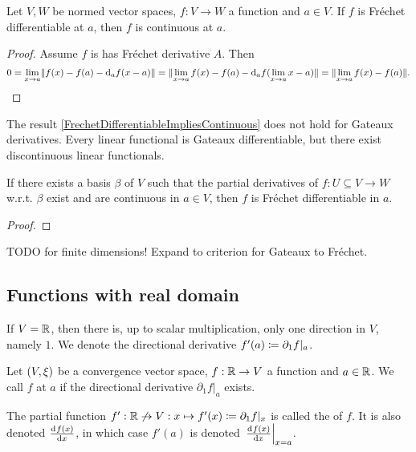 \begin{proposition} \label{FrechetDifferentiableImpliesContinuous}
Let $V,W$ be normed vector spaces, $f:V\to W$ a function and $a\in V$. If $f$ is Fréchet differentiable at $a$, then $f$ is continuous at $a$.
\end{proposition}
\begin{proof}
Assume $f$ is has Fréchet derivative $A$. Then
\[ 0 = \lim_{x\to a} \lVert f(x) - f(a) - \operatorname{d \!}{_af}(x-a)\rVert = \lVert\lim_{x\to a}f(x) - f(a) - \operatorname{d \!}{_af}(\lim_{x\to a} x-a)\rVert = \lVert\lim_{x\to a}f(x) - f(a)\rVert. \]
\end{proof}

\begin{example}
The result \ref{FrechetDifferentiableImpliesContinuous} does not hold for Gateaux derivatives. Every linear functional is Gateaux differentiable, but there exist discontinuous linear functionals.
\end{example}

\begin{proposition}
If there exists a basis $\beta$ of $V$ such that the partial derivatives of $f:U\subseteq V\to W$ w.r.t. $\beta$ exist and are continuous in $a\in V$, then $f$ is Fréchet differentiable in $a$.
\end{proposition}
\begin{proof}

\end{proof}
TODO for finite dimensions! Expand to criterion for Gateaux to Fréchet.
\begin{example}

\end{example}

\subsection{Functions with real domain}
If $V = \mathbb{R}$, then there is, up to scalar multiplication, only one direction in $V$, namely $1$. We denote the directional derivative $f'(a) \coloneqq \partial_1 f|_a$.


\begin{definition}
Let $\sSet{V,\xi}$ be a convergence vector space, $f: \mathbb{R} \to V$ a function and $a\in \mathbb{R}$. We call $f$  at $a$ if the directional derivative $\partial_1f|_a$ exists.

The partial function $f': \mathbb{R}\not\to V: x\mapsto f'(x) \coloneqq \partial_1f|_x$ is called the  of $f$. It is also denoted $\od{f(x)}{x}$, in which case $f'(a)$ is denoted $\left.\od{f(x)}{x}\right|_{x=a}$.
\end{definition}

